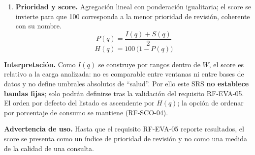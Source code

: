 \documentclass[11pt,a4paper]{report}
\begin{document}
\begin{enumerate}[label=\arabic*)]
\begin{equation}
\begin{cases}
0, & \text{en otro caso.}
\end{cases}
\end{equation}
\item \textbf{Prioridad y score.} Agregaci\'on lineal con ponderaci\'on igualitaria; el score se invierte para que 100 corresponda a la menor prioridad de revisi\'on, coherente con su nombre.
\begin{equation}\label{eq:prioridad}
P(q)=\frac{I(q)+S(q)}{2}
\end{equation}
\begin{equation}\label{eq:H}
H(q)=100\,\bigl(1-P(q)\bigr)
\end{equation}
\end{enumerate}

\textbf{Interpretaci\'on.} Como $I(q)$ se construye por rangos dentro de $W$, el score es relativo a la carga analizada: no es comparable entre ventanas ni entre bases de datos y no define umbrales absolutos de ``salud''. Por ello este SRS \textbf{no establece bandas fijas}; solo podr\'an definirse tras la validaci\'on del requisito RF-EVA-05. El orden por defecto del listado es ascendente por $H(q)$; la opci\'on de ordenar por porcentaje de consumo se mantiene (RF-SCO-04).

\textbf{Advertencia de uso.} Hasta que el requisito RF-EVA-05 reporte resultados, el score se presenta como un \'indice de prioridad de revisi\'on y no como una medida de la calidad de una consulta.
\end{document}
